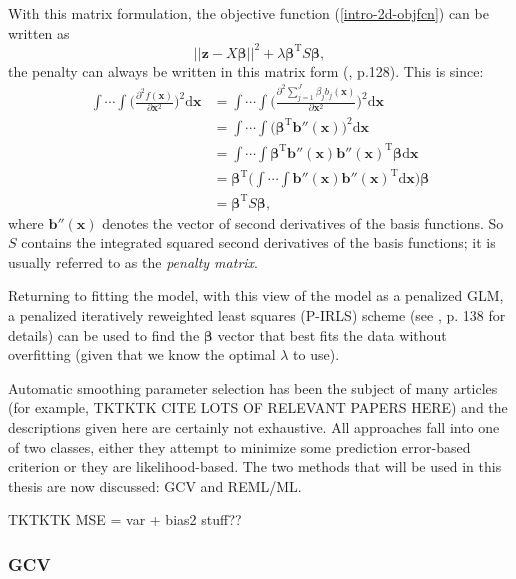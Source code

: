 With this matrix formulation, the objective function (\ref{intro-2d-objfcn}) can be written as
\begin{equation}
\lvert \lvert \bm{z} - X\bm{\beta} \rvert \rvert^2 + \lambda \bm{\beta}^\text{T} S \bm{\beta},
\end{equation}
the penalty can always be written in this matrix form (\cite{simonbook}, p.128). This is since:
\begin{align*}
\int\cdots\int \Big(\frac{\partial^2 f(\mathbf{x})}{\partial \mathbf{x}^2}\Big)^2 \text{d}\mathbf{x} &= \int\cdots\int \Big(\frac{\partial^2 \sum_{j=1}^J \beta_j b_j(\mathbf{x})}{\partial \mathbf{x}^2}\Big)^2 \text{d}\mathbf{x}\\
&= \int\cdots\int \Big(\bm{\beta}^\text{T}\mathbf{b}''(\mathbf{x})\Big)^2 \text{d}\mathbf{x}\\
&= \int\cdots\int \bm{\beta}^\text{T}\mathbf{b}''(\mathbf{x})\mathbf{b}''(\mathbf{x})^\text{T}\bm{\beta} \text{d}\mathbf{x}\\
&=\bm{\beta}^\text{T} \Big( \int\cdots\int \mathbf{b}''(\mathbf{x})\mathbf{b}''(\mathbf{x})^\text{T} \text{d}\mathbf{x}\Big) \bm{\beta}\\
&=\bm{\beta}^\text{T} S \bm{\beta},
\end{align*}
where $\mathbf{b}''(\mathbf{x})$ denotes the vector of second derivatives of the basis functions. So $S$ contains the integrated squared second derivatives of the basis functions; it is usually referred to as the \textit{penalty matrix}.

Returning to fitting the model, with this view of the model as a penalized GLM, a penalized iteratively reweighted least squares (P-IRLS) scheme (see \cite{simonbook}, p. 138 for details) can be used to find the $\bm{\beta}$ vector that best fits the data without overfitting (given that we know the optimal $\lambda$ to use).

Automatic smoothing parameter selection has been the subject of many articles (for example, TKTKTK CITE LOTS OF RELEVANT PAPERS HERE) and the descriptions given here are certainly not exhaustive. All approaches fall into one of two classes, either they attempt to minimize some prediction error-based criterion or they are likelihood-based. The two methods that will be used in this thesis are now discussed: GCV and REML/ML.



TKTKTK MSE = var + bias2 stuff??

\subsubsection{GCV}

